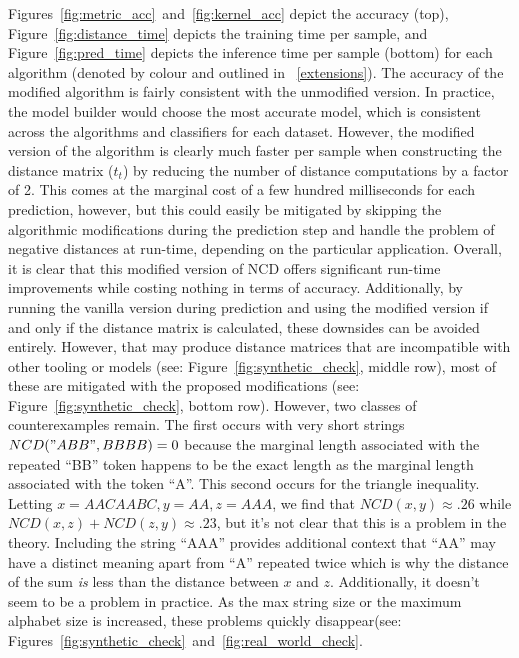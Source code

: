\documentclass[conference]{IEEEtran}
\begin{document}
Figures~\ref{fig:metric_acc}~and~\ref{fig:kernel_acc} depict the accuracy (top), Figure~\ref{fig:distance_time} depicts the   training time per sample, and Figure~\ref{fig:pred_time}  depicts the inference time per sample (bottom) for each algorithm (denoted by colour and outlined in ~\ref{extensions}). 
The accuracy of the modified algorithm is fairly consistent with the unmodified version. 
In practice, the model builder would choose the most accurate model, which is consistent across the algorithms and classifiers for each dataset. 
However, the modified version of the algorithm is clearly much faster per sample when constructing the distance matrix ($t_t$) by reducing the number of distance computations by a factor of 2. 
This comes at the marginal cost of a few hundred milliseconds for each prediction, however, but this could easily be mitigated by skipping the algorithmic modifications during the prediction step and handle the problem of negative distances at run-time, depending on the particular application. 
Overall, it is clear that this modified version of NCD offers significant run-time improvements while costing nothing in terms of accuracy. 
Additionally, by running the vanilla version during prediction and using the modified version if and only if the distance matrix is calculated, these downsides can be avoided entirely. 
However, that may produce distance matrices that are incompatible with other tooling or models (see: Figure~\ref{fig:synthetic_check}, middle row), most of these are mitigated with the proposed modifications (see: Figure~\ref{fig:synthetic_check}, bottom row). 
However, two classes of counterexamples remain. 
The first occurs with very short strings
$NCD("ABB", BBBB) =0$ because the marginal length associated with the repeated ``BB'' token happens to be the exact length as the marginal length associated with the token ``A''. 
This second occurs for the triangle inequality. 
Letting $x =AACAABC, y = AA,
z=AAA$, we find that $NCD(x,y) \approx .26$ while $NCD(x,z) + NCD(z,y) \approx .23$, but it's not clear that this is a problem in the theory. Including the string ``AAA'' provides additional context that ``AA'' may have a distinct meaning apart from ``A'' repeated twice which is why the distance of the sum \textit{is} less than the distance between $x$ and $z$. Additionally, it doesn't seem to be a problem in practice. 
As the max string size or the maximum alphabet size is increased, these problems quickly disappear(see: Figures~\ref{fig:synthetic_check}~and~\ref{fig:real_world_check}.
\end{document}
